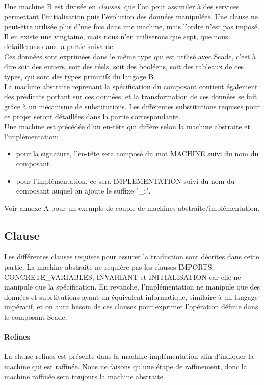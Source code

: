 Une machine B est divisée en \emph{clauses}, que l'on peut assimiler à
des services permettant l'initialisation puis l'évolution des données
manipulées. Une clause ne peut-être utilisée plus d'une fois dans une
machine, mais l'ordre n'est pas imposé. Il en existe une vingtaine,
mais nous n'en utiliserons que sept, que nous détaillerons dans la
partie suivante.\\ 
Ces données sont exprimées dans le même type qui est utilisé avec
Scade, c'est à dire soit des entiers, soit des réels, soit des
booléens, soit des tableaux de ces types, qui sont des types primitifs
du langage B. \\ 
La machine abstraite reprenant la spécification du composant contient
également des prédicats portant sur ces données, et la transformation
de ces données se fait grâce à un mécanisme de substitutions. Les
différentes substitutions requises pour ce projet seront détaillées
dans la partie correspondante. \\
Une machine est précédée d'un en-tête qui diffère selon la machine
abstraite et l'implémentation:
\begin{itemize}
\item pour la signature, l'en-tête sera composé du mot MACHINE suivi
  du nom du composant.
\item pour l'implémentation, ce sera IMPLEMENTATION suivi du nom du
  composant auquel on ajoute le suffixe "\_i".
\end{itemize}
Voir annexe A pour un exemple de couple de machines abstraite/implémentation.



\subsection{Clause}
Les différentes clauses requises pour assurer la traduction sont
décrites dans cette partie. La machine abstraite ne requière pas les
clauses IMPORTS, CONCRETE\_VARIABLES, INVARIANT et INITIALISATION car
elle ne manipule que la spécification. En revanche, l'implémentation ne
manipule que des données et substitutions ayant un équivalent
informatique, similaire à un langage impératif, et on aura besoin de
ces clauses pour exprimer l'opération définie dans le composant Scade.

\paragraph{Refines}
La clause refines est présente dans la machine implémentation afin
d'indiquer la machine qui est raffinée. Nous ne faisons qu'une étape
de raffinement, donc la machine raffinée sera toujours la machine
abstraite. 


